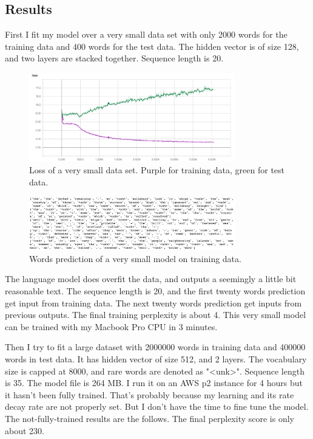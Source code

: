 \documentclass[a4paper]{article}
\begin{document}
\subsection{Results}

First I fit my model over a very small data set with only 2000 words for the training data and 400 words for the test data. The hidden vector is of size 128, and two layers are stacked together. Sequence length is 20.

\begin{figure}[H]
\centering
\includegraphics[width=0.8\textwidth]{small_loss.png}
\caption{Loss of a very small data set. Purple for training data, green for test data.}
\end{figure}

\begin{figure}[H]
\centering
\includegraphics[width=0.8\textwidth]{small_prediction.png}
\caption{Words prediction of a very small model on training data.}
\end{figure}

The language model does overfit the data, and outputs a seemingly a little bit reasonable text. The sequence length is 20, and the first twenty words prediction get input from training data. The next twenty words prediction get inputs from previous outputs. The final training perplexity is about 4. This very small model can be trained with my Macbook Pro CPU in 3 minutes. 

Then I try to fit a large dataset with 2000000 words in training data and 400000 words in test data. It has hidden vector of size 512, and 2 layers. The vocabulary size is capped at 8000, and rare words are denoted as "<unk>". Sequence length is 35. The model file is 264 MB. I run it on an AWS p2 instance for 4 hours but it hasn't been fully trained. That's probably because my learning and its rate decay rate are not properly set. But I don't have the time to fine tune the model. The not-fully-trained results are the follows. The final perplexity score is only about 230.
\end{document}

